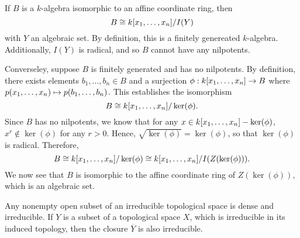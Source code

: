 \documentclass[10pt]{amsart}
\begin{document}
\begin{solution}
    \begin{luke}
    If $B$ is a $k$-algebra isomorphic to an affine coordinate ring, then 
    \[
        B \cong k[x_1, \dots, x_n]/I(Y)
    \]
    with $Y$ an algebraic set. By definition, this is a finitely genereated $k$-algebra. 
    Additionally, $I(Y)$ is radical, and so $B$ cannot have any nilpotents.

    Converseley, suppose $B$ is finitely generated and has no nilpotents. By definition, 
    there exists elements $b_1, \dots, b_n \in B$ and a surjection $\phi: k[x_1, \dots, x_n] \to B$ 
    where $p(x_1, \dots, x_n) \mapsto p(b_1, \dots, b_n)$. This establishes the isomorphism 
    \[
        B \cong k[x_1, \dots, x_n]/\ker(\phi).
    \]
    Since $B$ has no nilpotents, we know that for any 
    $x \in k[x_1, \dots, x_n] - \ker(\phi)$, $x^r \not\in \ker(\phi)$ for any $r > 0$.
    Hence, $\sqrt{\ker(\phi)} = \ker(\phi)$, so that $\ker(\phi)$ is radical.
    Therefore, 
    \[
        B \cong k[x_1, \dots, x_n]/\ker(\phi) \cong k[x_1, \dots, x_n]/I(Z(\ker(\phi))).
    \]
    We now see that $B$ is isomorphic to the affine coordinate ring of $Z(\ker(\phi))$, 
    which is an algebraic set.
    \end{luke}
\end{solution}

\begin{exercise}[1.6]
    Any nonempty open subset of an irreducible topological space is dense and
    irreducible.
    If $Y$ is a subset of a topological space $X$, which is irreducible in its
    induced topology, then the closure $\overline{Y}$ is also irreducible.
\end{exercise}
\end{document}
